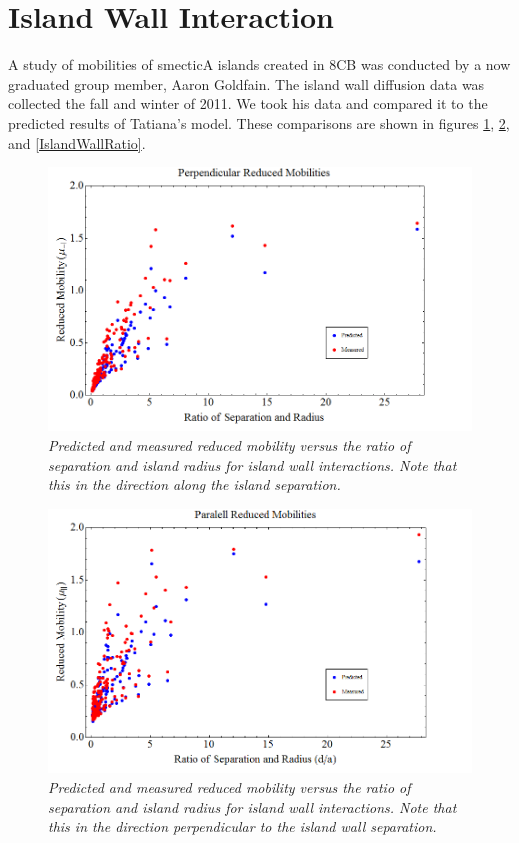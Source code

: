 \documentclass[11pt]{article}
\begin{document}
\section{Island Wall Interaction}
A study of mobilities of smecticA islands created in 8CB was conducted by a now graduated group member, Aaron Goldfain. The island wall diffusion data was collected the fall and winter of 2011. We took his data and compared it to the predicted results of Tatiana's model. These comparisons are shown in figures \ref{IslandWallPerp}, \ref{IslandWallPara}, and \ref{IslandWallRatio}.
\begin{figure}
\centering
\includegraphics[scale=0.4]{Images/IslandWallRedMobPerp.png}
\caption{\textit{Predicted and measured reduced mobility versus the ratio of separation and island radius for island wall interactions. Note that this in the direction along the island separation.}}
\label{IslandWallPerp}
\end{figure}

\begin{figure}
\centering
\includegraphics[scale=0.4]{Images/IslandWallRedMobPara.png}
\caption{\textit{Predicted and measured reduced mobility versus the ratio of separation and island radius for island wall interactions. Note that this in the direction perpendicular to the island wall separation.}}
\label{IslandWallPara}
\end{figure}
\end{document}

